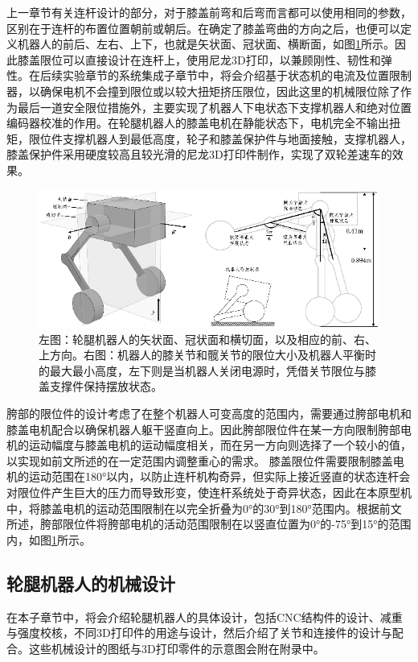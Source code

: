 上一章节有关连杆设计的部分，对于膝盖前弯和后弯而言都可以使用相同的参数，区别在于连杆的布置位置朝前或朝后。在确定了膝盖弯曲的方向之后，也便可以定义机器人的前后、左右、上下，也就是矢状面、冠状面、横断面，如图\ref{fig:sec2-3lim}所示。因此膝盖限位可以直接设计在连杆上，使用尼龙3D打印，以兼顾刚性、韧性和弹性。在后续实验章节的系统集成子章节中，将会介绍基于状态机的电流及位置限制器，以确保电机不会撞到限位或以较大扭矩挤压限位，因此这里的机械限位除了作为最后一道安全限位措施外，主要实现了机器人下电状态下支撑机器人和绝对位置编码器校准的作用。在轮腿机器人的膝盖电机在静能状态下，电机完全不输出扭矩，限位件支撑机器人到最低高度，轮子和膝盖保护件与地面接触，支撑机器人，膝盖保护件采用硬度较高且较光滑的尼龙3D打印件制作，实现了双轮差速车的效果。

\begin{figure}
  \centering
  \includegraphics[width=1.0\linewidth]{figures/Sec2/3lim.png}
  \caption{
  左图：轮腿机器人的矢状面、冠状面和横切面，以及相应的前、右、上方向。右图：机器人的膝关节和髋关节的限位大小及机器人平衡时的最大最小高度，左下则是当机器人关闭电源时，凭借关节限位与膝盖支撑件保持摆放状态。
  }
  \label{fig:sec2-3lim}
   \vspace{7pt}
\end{figure}


胯部的限位件的设计考虑了在整个机器人可变高度的范围内，需要通过胯部电机和膝盖电机配合以确保机器人躯干竖直向上。因此胯部限位件在某一方向限制胯部电机的运动幅度与膝盖电机的运动幅度相关，而在另一方向则选择了一个较小的值，以实现如前文所述的在一定范围内调整重心的需求。
膝盖限位件需要限制膝盖电机的运动范围在180°以内，以防止连杆机构奇异，但实际上接近竖直的状态连杆会对限位件产生巨大的压力而导致形变，使连杆系统处于奇异状态，因此在本原型机中，将膝盖电机的运动范围限制在以完全折叠为0°的30°到180°范围内。根据前文所述，胯部限位件将胯部电机的活动范围限制在以竖直位置为0°的-75°到15°的范围内，如图\ref{fig:sec2-3lim}所示。

\subsection{轮腿机器人的机械设计}
在本子章节中，将会介绍轮腿机器人的具体设计，包括CNC结构件的设计、减重与强度校核，不同3D打印件的用途与设计，然后介绍了关节和连接件的设计与配合。这些机械设计的图纸与3D打印零件的示意图会附在附录中。

